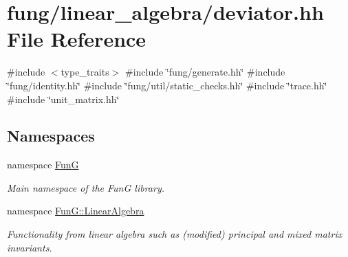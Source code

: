 \hypertarget{deviator_8hh}{\section{fung/linear\-\_\-algebra/deviator.hh \-File \-Reference}
\label{deviator_8hh}
}
{\ttfamily \#include $<$type\-\_\-traits$>$}\*
{\ttfamily \#include \char`\"{}fung/generate.\-hh\char`\"{}}\*
{\ttfamily \#include \char`\"{}fung/identity.\-hh\char`\"{}}\*
{\ttfamily \#include \char`\"{}fung/util/static\-\_\-checks.\-hh\char`\"{}}\*
{\ttfamily \#include \char`\"{}trace.\-hh\char`\"{}}\*
{\ttfamily \#include \char`\"{}unit\-\_\-matrix.\-hh\char`\"{}}\*
\subsection*{\-Namespaces}
\begin{DoxyCompactItemize}
\item 
namespace \hyperlink{namespaceFunG}{\-Fun\-G}
\begin{DoxyCompactList}\small\item\em \-Main namespace of the \-Fun\-G library. \end{DoxyCompactList}\item 
namespace \hyperlink{namespaceFunG_1_1LinearAlgebra}{\-Fun\-G\-::\-Linear\-Algebra}
\begin{DoxyCompactList}\small\item\em \-Functionality from linear algebra such as (modified) principal and mixed matrix invariants. \end{DoxyCompactList}\end{DoxyCompactItemize}
